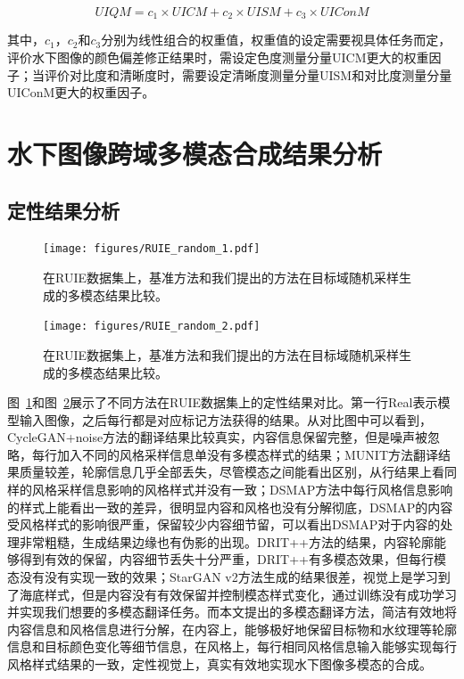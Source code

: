 \begin{equation}
\label{equ:uiqm}
UIQM = c_1 \times UICM + c_2 \times UISM + c_3 \times UIConM
\end{equation}

其中，$c_1$，$c_2$和$c_3$分别为线性组合的权重值，权重值的设定需要视具体任务而定，评价水下图像的颜色偏差修正结果时，需设定色度测量分量UICM更大的权重因子；当评价对比度和清晰度时，需要设定清晰度测量分量UISM和对比度测量分量UIConM更大的权重因子。

\section{水下图像跨域多模态合成结果分析}
\subsection{定性结果分析}

\begin{figure}
    \centering
	\texttt{[image: figures/RUIE\_random\_1.pdf]}
	\caption{在RUIE数据集上，基准方法和我们提出的方法在目标域随机采样生成的多模态结果比较。}
	\label{fig:ruie_random_1}
\end{figure}

\begin{figure}
    \centering
	\texttt{[image: figures/RUIE\_random\_2.pdf]}
	\caption{在RUIE数据集上，基准方法和我们提出的方法在目标域随机采样生成的多模态结果比较。}
	\label{fig:ruie_random_2}
\end{figure}

图~\ref{fig:ruie_random_1}和图~\ref{fig:ruie_random_2}展示了不同方法在RUIE数据集上的定性结果对比。第一行Real表示模型输入图像，之后每行都是对应标记方法获得的结果。从对比图中可以看到，CycleGAN+noise方法的翻译结果比较真实，内容信息保留完整，但是噪声被忽略，每行加入不同的风格采样信息单没有多模态样式的结果；MUNIT方法翻译结果质量较差，轮廓信息几乎全部丢失，尽管模态之间能看出区别，从行结果上看同样的风格采样信息影响的风格样式并没有一致；DSMAP方法中每行风格信息影响的样式上能看出一致的差异，很明显内容和风格也没有分解彻底，DSMAP的内容受风格样式的影响很严重，保留较少内容细节留，可以看出DSMAP对于内容的处理非常粗糙，生成结果边缘也有伪影的出现。DRIT++方法的结果，内容轮廓能够得到有效的保留，内容细节丢失十分严重，DRIT++有多模态效果，但每行模态没有没有实现一致的效果；StarGAN v2方法生成的结果很差，视觉上是学习到了海底样式，但是内容没有有效保留并控制模态样式变化，通过训练没有成功学习并实现我们想要的多模态翻译任务。而本文提出的多模态翻译方法，简洁有效地将内容信息和风格信息进行分解，在内容上，能够极好地保留目标物和水纹理等轮廓信息和目标颜色变化等细节信息，在风格上，每行相同风格信息输入能够实现每行风格样式结果的一致，定性视觉上，真实有效地实现水下图像多模态的合成。

